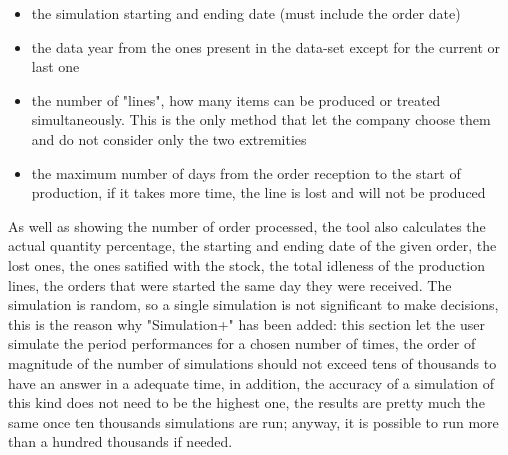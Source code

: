 \documentclass[a4paper,12pt]{article}
\begin{document}
\begin{itemize}
	\item the simulation starting and ending date (must include the order date)
	\item the data year from the ones present in the data-set except for the current or last one
	\item the number of "lines", how many items can be produced or treated simultaneously. This is the only method that let the company choose them and do not consider only the two extremities
	\item the maximum number of days from the order reception to the start of production, if it takes more time, the line is lost and will not be produced
\end{itemize}
As well as showing the number of order processed, the tool also calculates the actual quantity percentage, the starting and ending date of the given order, the lost ones, the ones satified with the stock, the total idleness of the production lines, the orders that were started the same day they were received. The simulation is random, so a single simulation is not significant to make decisions, this is the reason why "Simulation+" has been added: this section let the user simulate the period performances for a chosen number of times, the order of magnitude of the number of simulations should not exceed tens of thousands to have an answer in a adequate time, in addition, the accuracy of a simulation of this kind does not need to be the highest one, the results are pretty much the same once ten thousands simulations are run; anyway, it is possible to run more than a hundred thousands if needed.


\newpage
\end{document}
